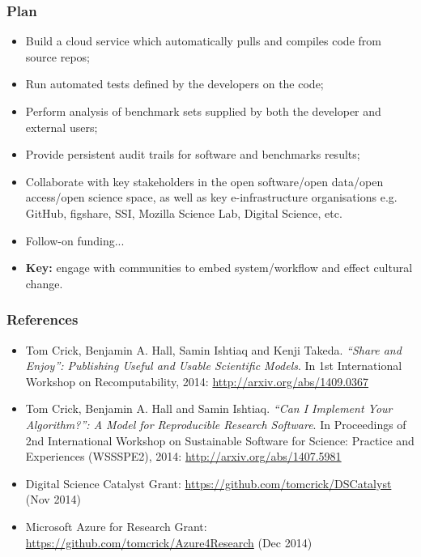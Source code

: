\documentclass[pdftex]{beamer}
\begin{document}


\begin{frame}
\frametitle{Plan}
{\small{\begin{itemize}
\item Build a cloud service which automatically pulls and compiles code from source repos;
\item Run automated tests defined by the developers on the code;
\item Perform analysis of benchmark sets supplied by both the developer and external users;
\item Provide persistent audit trails for software and benchmarks results;
\item Collaborate with key stakeholders in the open software/open
  data/open access/open science space, as well as key e-infrastructure
  organisations e.g. GitHub, figshare, SSI, Mozilla Science Lab,
  Digital Science, etc.
\item Follow-on funding...
\item {\textbf{Key:}} engage with communities to embed system/workflow and effect
  cultural change.
\end{itemize}}}
\end{frame}


\begin{frame}
\frametitle{References}
{\small{\begin{itemize}
\item Tom Crick, Benjamin A. Hall, Samin Ishtiaq and Kenji
  Takeda. {\emph{``Share and Enjoy'': Publishing Useful and Usable
      Scientific Models}}. In 1st International Workshop on
  Recomputability, 2014: \url{http://arxiv.org/abs/1409.0367}
\item Tom Crick, Benjamin A. Hall and Samin Ishtiaq. {\emph{``Can I Implement
  Your Algorithm?'': A Model for Reproducible Research Software}}. In
  Proceedings of 2nd International Workshop on Sustainable Software
  for Science: Practice and Experiences (WSSSPE2), 2014:
  \url{http://arxiv.org/abs/1407.5981}
\item Digital Science Catalyst Grant:
  \url{https://github.com/tomcrick/DSCatalyst} (Nov 2014)
\item Microsoft Azure for Research Grant:
  \url{https://github.com/tomcrick/Azure4Research} (Dec 2014)
\end{itemize}}}
\end{frame}
\end{document}
